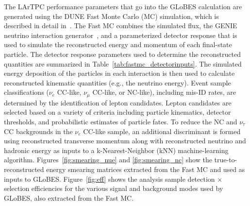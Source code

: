 The LArTPC performance parameters that go into the GLoBES calculation
are generated using the DUNE Fast Monte Carlo (MC) simulation, which
is described in detail in~\cite{Adams:2013qkq}.  The Fast MC combines
the simulated flux, the GENIE neutrino interaction
generator~\cite{Andreopoulos:2009rq}, and a parameterized detector
response that is used to simulate the reconstructed energy and
momentum of each final-state particle. The detector response
parameters used to determine the reconstructed quantities are
summarized in Table~\ref{tab:fastmc_detectorinputs}.
The simulated energy
deposition of the particles in each interaction is then used to
calculate reconstructed kinematic quantities (e.g., the neutrino
energy). Event sample classifications ($\nu_e$ CC-like, $\nu_{\mu}$
CC-like, or NC-like), including mis-ID rates, are determined by the
identification of lepton candidates. Lepton candidates are selected
based on a variety of criteria including particle kinematics,
detector thresholds, and probabilistic estimates of particle fates. To
reduce the NC and $\nu_{\tau}$ CC backgrounds in the $\nu_e$ CC-like
sample, an additional discriminant is formed using reconstructed
transverse momentum along with reconstructed neutrino and hadronic
energy as inputs to a k-Nearest-Neighbor (kNN) machine-learning
algorithm.  Figures~\ref{fig:smearing_nue} and \ref{fig:smearing_nc} show
the true-to-reconstructed energy smearing matrices extracted from the
Fast MC and used as inputs to GLoBES.  Figure~\ref{fig:eff} shows the
analysis sample detection $\times$ selection efficiencies for the
various signal and background modes used by GLoBES, also extracted
from the Fast MC.

